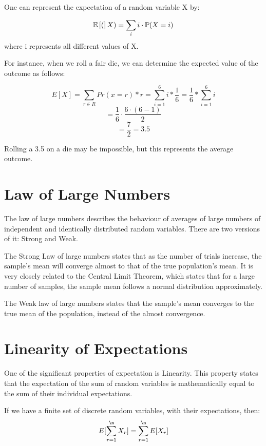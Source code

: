 \begin{definition}
    One can represent the expectation of a random variable X by:

    \[
    \operatorname{\mathbb{E}}\left[(\right]X) = \sum_i i \cdot \mathbb{P}(X = i)
    \]
where i represents all different values of X.
\end{definition}

\newpage

For instance, when we roll a fair die, we can determine the expected value of the outcome as follows:

\[
E[X] = \sum_{r \in R} Pr(x=r)*r = \sum_{i=1}^{6} i*\frac{1}{6} = \frac{1}{6} *\sum_{i=1}^{6} i
\]
\[
= \frac{1}{6} \cdot \frac{6 \cdot (6-1)}{2}
\]
\[
= \frac{7}{2} = 3.5
\]

Rolling a 3.5 on a die may be impossible, but this represents the average outcome.

\section*{Law of Large Numbers}
The law of large numbers describes the behaviour of averages of large numbers of independent and identically distributed random variables. There are two versions of it: Strong and Weak. 

The Strong Law of large numbers states that as the number of trials increase, the sample's mean will converge almost to that of the true population's mean. It is very closely related to the Central Limit Theorem, which states that for a large number of samples, the sample mean follows a normal distribution approximately.


The Weak law of large numbers states that the sample's mean converges to the true mean of the population, instead of the almost convergence.

\section*{Linearity of Expectations}
One of the significant properties of expectation is Linearity. This property states that the expectation of the sum of random variables is mathematically equal to the sum of their individual expectations.

\begin{theorem}
    If we have a finite set of discrete random variables, with their expectations, then:
    \[
    E[\sum_{r=1}^{\n} X_r] = \sum_{r=1}^{\n} E[X_r]
    \]
\end{theorem}

